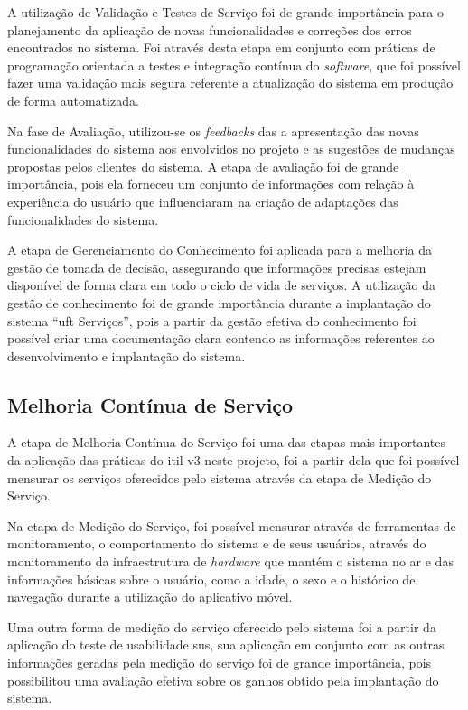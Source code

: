 A utilização de Validação e Testes de Serviço foi de grande importância para o planejamento da aplicação de novas funcionalidades e correções dos erros encontrados no sistema. Foi através desta etapa em conjunto com práticas de programação orientada a testes e integração contínua do \textit{software}, que foi possível fazer uma validação mais segura referente a atualização do sistema em produção de forma automatizada.

Na fase de Avaliação, utilizou-se os \textit{feedbacks} das  a apresentação das novas funcionalidades do sistema aos envolvidos no projeto e as sugestões de mudanças propostas pelos clientes do sistema. A etapa de avaliação foi de grande importância, pois ela forneceu um conjunto de informações com relação à experiência do usuário que influenciaram na criação de adaptações das funcionalidades do sistema.

A etapa de Gerenciamento do Conhecimento foi aplicada para a melhoria da gestão de tomada de decisão, assegurando que informações precisas estejam disponível de forma clara em todo o ciclo de vida de serviços. A utilização da gestão de conhecimento foi de grande importância durante a implantação do sistema ``\acrshort{uft} Serviços'', pois a partir da gestão efetiva do conhecimento foi possível criar uma documentação clara contendo as informações referentes ao desenvolvimento e implantação do sistema.

\subsection*{Melhoria Contínua de Serviço}

\noindent A etapa de Melhoria Contínua do Serviço foi uma das etapas mais importantes da aplicação das práticas do \acrshort{itil} v3 neste projeto, foi a partir dela que foi possível mensurar os serviços oferecidos pelo sistema através da etapa de Medição do Serviço.

Na etapa de Medição do Serviço, foi possível mensurar através de ferramentas de monitoramento, o comportamento do sistema e de seus usuários, através do monitoramento da infraestrutura de \textit{hardware} que mantém o sistema no ar e das informações básicas sobre o usuário, como a idade, o sexo e o histórico de navegação durante a utilização do aplicativo móvel.

Uma outra forma de medição do serviço oferecido pelo sistema foi a partir da aplicação do teste de usabilidade  \acrshort{sus}, sua aplicação em conjunto com as outras informações geradas pela medição do serviço foi de grande importância, pois possibilitou uma avaliação efetiva sobre os ganhos obtido pela implantação do sistema.

